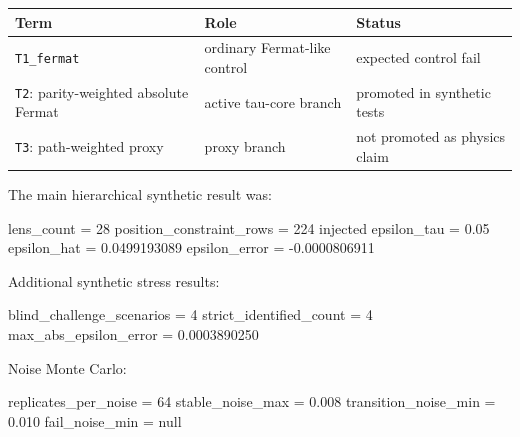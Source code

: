 \documentclass[11pt]{article}
\newenvironment{Shaded}{}{}
\newcommand{\NormalTok}[1]{#1}
\newcounter{none} %
\begin{document}
{\def\LTcaptype{none} %
\begin{longtable}[]{@{}
  >{\raggedright\arraybackslash}p{}
  >{\raggedright\arraybackslash}p{}
  >{\raggedright\arraybackslash}p{}@{}}
\toprule\noalign{}
\begin{minipage}[b]{\linewidth}\raggedright
Term
\end{minipage} & \begin{minipage}[b]{\linewidth}\raggedright
Role
\end{minipage} & \begin{minipage}[b]{\linewidth}\raggedright
Status
\end{minipage} \\
\midrule\noalign{}
\endhead
\bottomrule\noalign{}
\endlastfoot
\texttt{T1\_fermat} & ordinary Fermat-like control & expected control
fail \\
\texttt{T2}: parity-weighted absolute Fermat & active tau-core branch &
promoted in synthetic tests \\
\texttt{T3}: path-weighted proxy & proxy branch & not promoted as
physics claim \\
\end{longtable}
}

The main hierarchical synthetic result was:

\begin{Shaded}
\begin{Highlighting}[]
\NormalTok{lens\_count = 28}
\NormalTok{position\_constraint\_rows = 224}
\NormalTok{injected epsilon\_tau = 0.05}
\NormalTok{epsilon\_hat = 0.0499193089}
\NormalTok{epsilon\_error = {-}0.0000806911}
\end{Highlighting}
\end{Shaded}

Additional synthetic stress results:

\begin{Shaded}
\begin{Highlighting}[]
\NormalTok{blind\_challenge\_scenarios = 4}
\NormalTok{strict\_identified\_count = 4}
\NormalTok{max\_abs\_epsilon\_error = 0.0003890250}
\end{Highlighting}
\end{Shaded}

Noise Monte Carlo:

\begin{Shaded}
\begin{Highlighting}[]
\NormalTok{replicates\_per\_noise = 64}
\NormalTok{stable\_noise\_max = 0.008}
\NormalTok{transition\_noise\_min = 0.010}
\NormalTok{fail\_noise\_min = null}
\end{Highlighting}
\end{Shaded}
\end{document}
